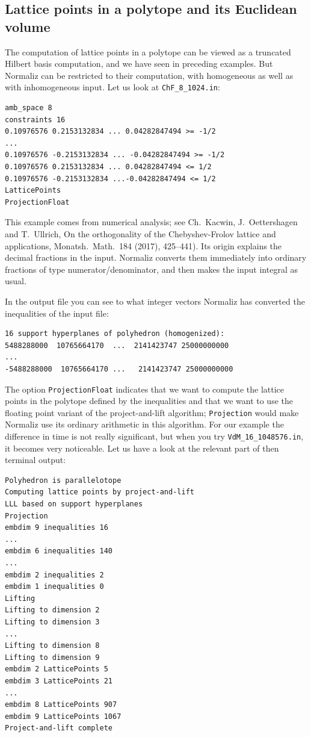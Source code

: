 \subsection{Lattice points in a polytope and its Euclidean volume}\label{project_example}

The computation of lattice points in a polytope can be viewed as a truncated Hilbert basis computation, and we have seen in preceding examples. But Normaliz can be restricted to their computation, with homogeneous as well as with inhomogeneous input. Let us look at \verb|ChF_8_1024.in|:

\begin{Verbatim}
amb_space 8
constraints 16
0.10976576 0.2153132834 ... 0.04282847494 >= -1/2
...
0.10976576 -0.2153132834 ... -0.04282847494 >= -1/2
0.10976576 0.2153132834 ... 0.04282847494 <= 1/2
0.10976576 -0.2153132834 ...-0.04282847494 <= 1/2
LatticePoints
ProjectionFloat
\end{Verbatim}

This example comes from numerical analysis; see Ch.~Kacwin, J.~Oettershagen and T.~Ullrich, On the orthogonality of the Chebyshev-Frolov lattice and applications, Monatsh.\ Math.\ 184 (2017), 425--441). Its origin explains the decimal fractions in the input. Normaliz converts them immediately into ordinary fractions of type numerator/denominator, and then makes the input integral as usual.

In the output file you can see to what integer vectors Normaliz has converted the inequalities of the input file:
\begin{Verbatim}
16 support hyperplanes of polyhedron (homogenized):
5488288000  10765664170  ...  2141423747 25000000000
...
-5488288000  10765664170 ...   2141423747 25000000000
\end{Verbatim}

The option \verb|ProjectionFloat| indicates that we want to compute the lattice points in the polytope defined by the inequalities and that we want to use the floating point variant of the project-and-lift algorithm; \verb|Projection| would make Normaliz use its ordinary arithmetic in this algorithm. For our example the difference in time is not really significant, but when you try \verb|VdM_16_1048576.in|, it becomes very noticeable. Let us have a look at the relevant part of then terminal output:
\begin{Verbatim}
Polyhedron is parallelotope
Computing lattice points by project-and-lift
LLL based on support hyperplanes
Projection
embdim 9 inequalities 16
...
embdim 6 inequalities 140
...
embdim 2 inequalities 2
embdim 1 inequalities 0
Lifting
Lifting to dimension 2
Lifting to dimension 3
...
Lifting to dimension 8
Lifting to dimension 9
embdim 2 LatticePoints 5
embdim 3 LatticePoints 21
...
embdim 8 LatticePoints 907
embdim 9 LatticePoints 1067
Project-and-lift complete
\end{Verbatim}


